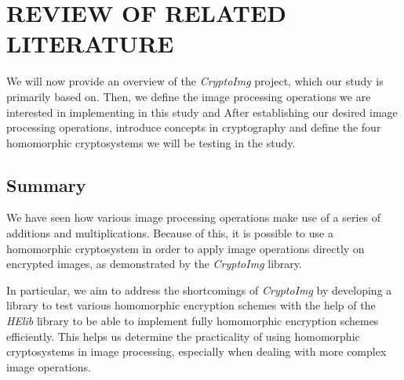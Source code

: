 \chapter{REVIEW OF RELATED LITERATURE}

We will now provide an overview of the \textit{CryptoImg} project, which our study is primarily based on. Then, we define the image processing operations we are interested in implementing in this study and
After establishing our desired image processing operations, introduce concepts in cryptography and define the four homomorphic cryptosystems we will be testing in the study.









\section{Summary}
We have seen how various image processing operations make use of a series of additions and multiplications. Because of this, it is possible to use a homomorphic cryptosystem in order to apply image operations directly on encrypted images, as demonstrated by the \textit{CryptoImg} library.

In particular, we aim to address the shortcomings of \textit{CryptoImg} by developing a library to test various homomorphic encryption schemes with the help of the \textit{HElib} library to be able to implement fully homomorphic encryption schemes efficiently. This helps us determine the practicality of using homomorphic cryptosystems in image processing, especially when dealing with more complex image operations.
